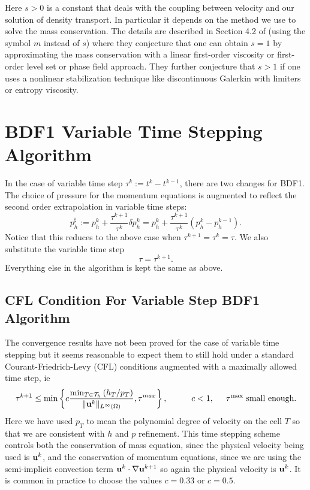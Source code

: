 \documentclass[letterpaper]{erdc}
\begin{document}
\begin{remark}
  Here $s>0$ is a constant that deals with the coupling between velocity and our solution of density transport.  In particular it depends on the method we use to solve the mass conservation.  The details are described in Section 4.2 of \cite{guermond2011error} (using the symbol $m$ instead of $s$) where they conjecture that one can obtain $s=1$ by approximating the mass conservation with a linear first-order viscosity or first-order level set or phase field approach.  They further conjecture that $s>1$ if one uses a nonlinear stabilization technique like discontinuous Galerkin with limiters or entropy viscosity.  
\end{remark}


%
%
\section{BDF1 Variable Time Stepping Algorithm}\label{sec:BDF1VariableTimeSteppingAlgorithm}
In the case of variable time step  $\tau^{k} := t^{k}-t^{k-1}$, there are two changes for BDF1.  The choice of pressure for the momentum equations is augmented to reflect the second order extrapolation in variable time steps:
\begin{equation}
  p^{\sharp}_h := p_h^{k} + \frac{\tau^{k+1}}{\tau^{k}}\delta p_h^{k} = p_h^{k} + \frac{\tau^{k+1}}{\tau^{k}}\left( p_h^{k} - p_h^{k-1} \right).
\end{equation}
Notice that this reduces to the above case when $\tau^{k+1}=\tau^{k} = \tau$.  We also substitute the variable time step
\begin{equation}
  \tau =\tau^{k+1}.
\end{equation}
Everything else in the algorithm is kept the same as above.

\subsection{CFL Condition For Variable Step BDF1 Algorithm}\label{sec:CFLBDF1}
The convergence results have not been proved for the case of variable time stepping but it seems reasonable to expect them to still hold under a standard Courant-Friedrich-Levy (CFL) conditions augmented with a maximally allowed time step, ie
\begin{equation}
  \tau^{k+1} \leq \min \left\{c \frac{\min_{T\in\mathcal{T}_h}\left(h_{T}/p_T\right)}{\|\textbf{u}^{k}\|_{L^{\infty}(\Omega)}}, \tau^{max}\right\}, \hspace{1cm} c<1, \hspace{0.5cm}\tau^{\max} \mbox{ small enough}.
\end{equation}
Here we have used $p_T$ to mean the polynomial degree of velocity on the cell $T$ so that we are consistent with $h$ and $p$ refinement.  This time stepping scheme controls both the conservation of mass equation, since the physical velocity being used is $\textbf{u}^{k}$, and the conservation of momentum equations, since we are using the semi-implicit convection term $\textbf{u}^{k}\cdot\nabla\textbf{u}^{k+1}$ so again the physical velocity is $\textbf{u}^{k}$.  It is common in practice to choose the values $c=0.33$ or $c=0.5$.
\end{document}
